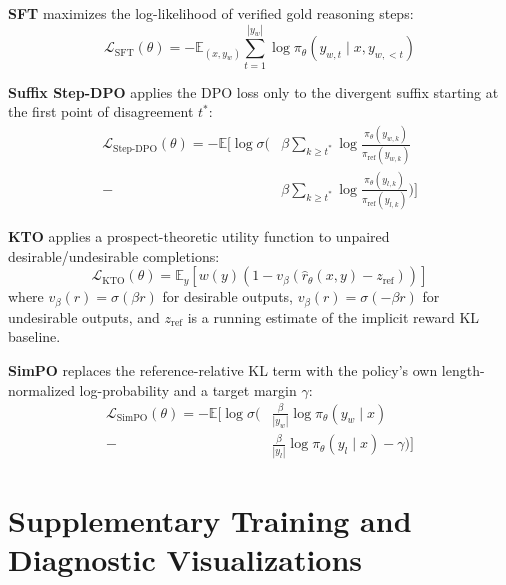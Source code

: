 \documentclass[11pt]{article}
\begin{document}
\textbf{SFT} maximizes the log-likelihood of verified gold reasoning steps:
\begin{equation}
    \mathcal{L}_{\text{SFT}}(\theta) = -\mathbb{E}_{(x, y_w)} \sum_{t=1}^{|y_w|} \log \pi_\theta(y_{w,t} \mid x, y_{w,<t})
    \label{eq:sft_loss}
\end{equation}

\textbf{Suffix Step-DPO} applies the DPO loss only to the divergent suffix starting at the first point of disagreement $t^*$:
\begin{align}
    \mathcal{L}_{\text{Step-DPO}}(\theta) = -\mathbb{E} \Big[ \log \sigma \Big( & \beta \sum_{k \ge t^*} \log \tfrac{\pi_\theta(y_{w,k})}{\pi_{\text{ref}}(y_{w,k})} \nonumber \\
    {} - & \beta \sum_{k \ge t^*} \log \tfrac{\pi_\theta(y_{l,k})}{\pi_{\text{ref}}(y_{l,k})} \Big) \Big]
    \label{eq:stepdpo_loss}
\end{align}

\textbf{KTO} applies a prospect-theoretic utility function to unpaired desirable/undesirable completions:
\begin{equation}
    \mathcal{L}_{\text{KTO}}(\theta) = \mathbb{E}_{y} \left[ w(y) \left( 1 - v_\beta \left( \hat{r}_\theta(x, y) - z_{\text{ref}} \right) \right) \right]
    \label{eq:kto_loss}
\end{equation}
where $v_\beta(r) = \sigma(\beta r)$ for desirable outputs, $v_\beta(r) = \sigma(-\beta r)$ for undesirable outputs, and $z_{\text{ref}}$ is a running estimate of the implicit reward KL baseline.

\textbf{SimPO} replaces the reference-relative KL term with the policy's own length-normalized log-probability and a target margin $\gamma$:
\begin{align}
    \mathcal{L}_{\text{SimPO}}(\theta) = -\mathbb{E} \Big[ \log \sigma \Big( & \tfrac{\beta}{|y_w|} \log \pi_\theta(y_w \mid x) \nonumber \\
    {} - & \tfrac{\beta}{|y_l|} \log \pi_\theta(y_l \mid x) - \gamma \Big) \Big]
    \label{eq:simpo_loss}
\end{align}

\section{Supplementary Training and Diagnostic Visualizations}
\label{sec:appendix_diagnostics}
\end{document}
